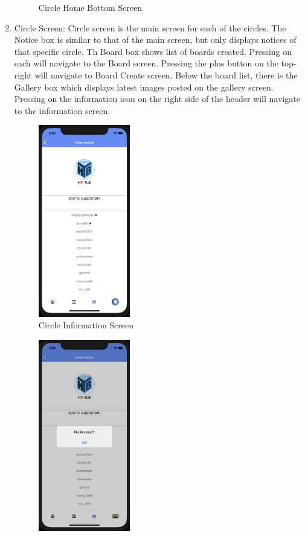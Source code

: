 \documentclass[conference]{IEEEtran}
\begin{document}
\begin{enumerate}
\begin{figure}[h]
        \caption{Circle Home Bottom Screen}
        \label{fig:my_label}
    \end{figure}
    \item Circle Screen: Circle screen is the main screen for each of the circles. The Notice box is similar to that of the main screen, but only displays notices of that specific circle. Th Board box shows list of boards created. Pressing on each will navigate to the Board screen. Pressing the plus button on the top-right will navigate to Board Create screen. Below the board list, there is the Gallery box which displays latest images posted on the gallery screen. Pressing on the information icon on the right side of the header will navigate to the information screen.
    \begin{figure}[h]
        \centering
        \includegraphics[width=4cm]{images/circleinformation1.png}
        \caption{Circle Information Screen}
        \label{fig:my_label}
    \end{figure}
    \begin{figure}[h]
        \centering
        \includegraphics[width=4cm]{images/circleinformation2.png}

\end{figure}
\end{enumerate}
\end{document}
